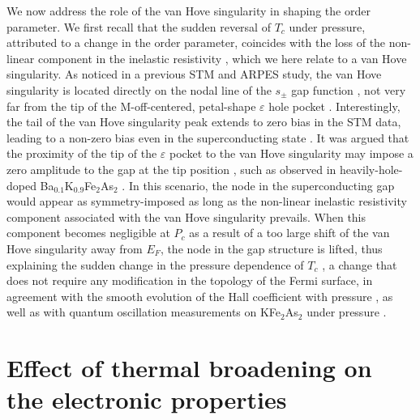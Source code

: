 \documentclass[twocolumn,aps,showpacs,preprintnumbers,amsmath,amssymb, superscriptaddress,longbibliography]{revtex4-1}
\begin{document}
We now address the role of the van Hove singularity in shaping the order parameter. We first recall that the sudden reversal of $T_c$ under pressure, attributed to a change in the order parameter, coincides with the loss of the non-linear component in the inelastic resistivity \cite{Tafti_nphys9,Tafti_PRB89,Tafti_PRB91}, which we here relate to a van Hove singularity. As noticed in a previous STM and ARPES study, the van Hove singularity is located directly on the nodal line of the $s_{\pm}$ gap function \cite{DL_Fang_vHs}, not very far from the tip of the M-off-centered, petal-shape $\varepsilon$ hole pocket \cite{Sato_PRL2009}. Interestingly, the tail of the van Hove singularity peak extends to zero bias in the STM data, leading to a non-zero bias even in the superconducting state \cite{DL_Fang_vHs}. It was argued that the proximity of the tip of the $\varepsilon$ pocket to the van Hove singularity may impose a zero amplitude to the gap at the tip position \cite{DL_Fang_vHs}, such as observed in heavily-hole-doped Ba$_{0.1}$K$_{0.9}$Fe$_2$As$_2$ \cite{Nan_XuPRB88}. In this scenario, the node in the superconducting gap would appear as symmetry-imposed as long as the non-linear inelastic resistivity component associated with the van Hove singularity prevails. When this component becomes negligible at $P_c$ as a result of a too large shift of the van Hove singularity away from $E_F$, the node in the gap structure is lifted, thus explaining the sudden change in the pressure dependence of $T_c$ \cite{Tafti_nphys9,Tafti_PRB89,Tafti_PRB91}, a change that does not require any modification in the topology of the Fermi surface, in agreement with the smooth evolution of the Hall coefficient with pressure \cite{Tafti_nphys9,Tafti_PRB89,Tafti_PRB91}, as well as with quantum oscillation measurements on KFe$_2$As$_2$ under pressure \cite{Terashima_PRB89}. 

\section{Effect of thermal broadening on the electronic properties\label{temperature_section}}
\end{document}
